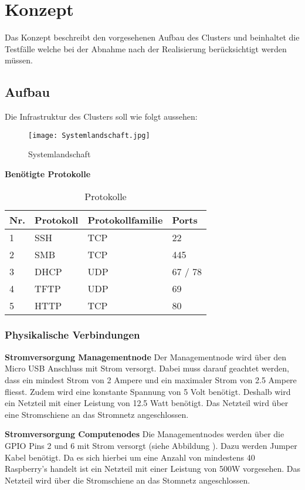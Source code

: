\section{Konzept} 
\label{sec:Konzept}
Das Konzept beschreibt den vorgesehenen Aufbau des Clusters und beinhaltet die Testfälle welche bei der Abnahme nach der Realisierung berücksichtigt werden müssen.

\subsection{Aufbau}
Die Infrastruktur des Clusters soll wie folgt aussehen:

\begin{figure}[htb]
\centering
\texttt{[image: Systemlandschaft.jpg]}
\caption{Systemlandschaft}
\label{fig:Systemlandschaft}
\end{figure} 

\textbf{Benötigte Protokolle}
\begin{table}[H]
\centering
\begin{tabular}{p{1cm}p{5cm}p{5cm}p{5cm}}
\hline
\rowcolor{heading} \textbf{Nr.} & \textbf{Protokoll} & \textbf{Protokollfamilie} & Ports \\\hline
1 & SSH & TCP & 22 \\\hline
2 & SMB & TCP & 445 \\\hline
3 & DHCP & UDP & 67 / 78 \\\hline
4 & TFTP & UDP & 69 \\\hline
5 & HTTP & TCP & 80 \\\hline
\end{tabular}
\caption{Protokolle}
\end{table}
\subsubsection{Physikalische Verbindungen}

\textbf{Stromversorgung Managementnode}\newline
Der Managementnode wird über den Micro USB Anschluss mit Strom versorgt. Dabei muss darauf geachtet werden, dass ein mindest Strom von 2 Ampere und ein maximaler Strom von 2.5 Ampere fliesst. Zudem wird eine konstante Spannung von 5 Volt benötigt. Deshalb wird ein Netzteil mit einer Leistung von 12.5 Watt benötigt. Das Netzteil wird über eine Stromschiene an das Stromnetz angeschlossen.

\textbf{Stromversorgung Computenodes}\newline
Die Managementnodes werden über die GPIO Pins 2 und 6 mit Strom versorgt (siehe Abbildung ). Dazu werden Jumper Kabel benötigt. Da es sich hierbei um eine Anzahl von mindestens 40 Raspberry's handelt ist ein Netzteil mit einer Leistung von 500W vorgesehen. Das Netzteil wird über die Stromschiene an das Stomnetz angeschlossen.

